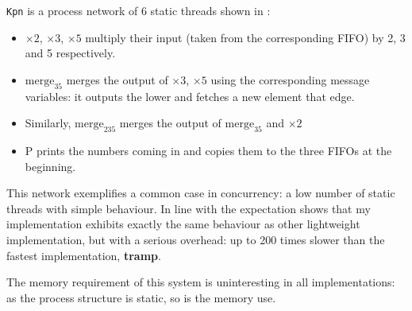 \documentclass[12pt,twoside,notitlepage]{report}
\begin{document}
\verb|Kpn| is a process network of 6 static threads shown in :
\begin{itemize}
\item{$ \times 2 $, $ \times 3 $, $ \times 5 $ multiply their input (taken from the corresponding FIFO) by 2, 3 and 5 respectively.}
\item{$ \text{merge}_{35} $ merges the output of $ \times 3 $, $ \times 5 $ using the corresponding message variables: it outputs the lower and fetches a new element that edge.}
\item{Similarly, $ \text{merge}_{235} $ merges the output of $ \text{merge}_{35} $ and $ \times 2 $}
\item{P prints the numbers coming in and copies them to the three FIFOs at the beginning.}
\end{itemize}
This network exemplifies a common case in concurrency: a low number of static threads with simple behaviour. In line with the expectation  shows that my implementation exhibits exactly the same behaviour as other lightweight implementation, but with a serious overhead: up to 200 times slower than the fastest implementation, \textbf{tramp}.  

The memory requirement of this system is uninteresting in all implementations: as the process structure is static, so is the memory use.
\end{document}
